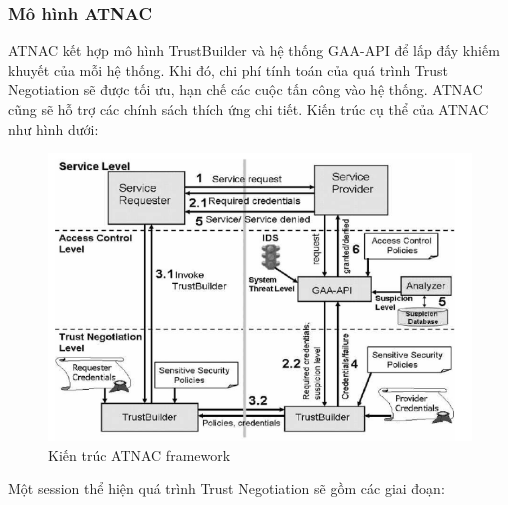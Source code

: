 \documentclass[12pt]{article}
\begin{document}
\subsubsection{Mô hình ATNAC}
ATNAC kết hợp mô hình TrustBuilder và hệ thống GAA-API để lấp đấy khiếm khuyết của mỗi hệ thống. Khi đó, chi phí tính toán của quá trình Trust Negotiation sẽ được tối ưu, hạn chế các cuộc tấn công vào hệ thống. ATNAC cũng sẽ hỗ trợ các chính sách thích ứng chi tiết. Kiến trúc cụ thể của ATNAC như hình dưới:

\begin{figure}[H]
\centering
\includegraphics[scale=.7]{img/atnac.png}
\caption{Kiến trúc ATNAC framework}
\end{figure}
Một session thể hiện quá trình Trust Negotiation sẽ gồm các giai đoạn:
\end{document}
